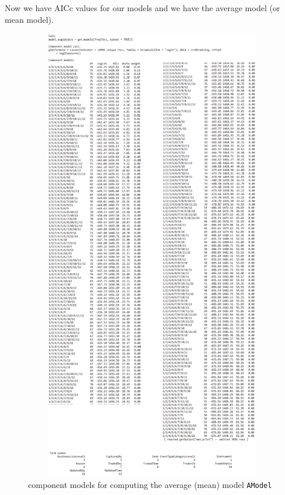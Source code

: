 \documentclass{DissertateUSU}
\begin{document}
\normalsize

Now we have AICc values for our models and we have the average model (or
mean model).

\begin{figure}
\centering
\includegraphics[height=20cm, width=15cm]{Get_models_bin1.eps}
\caption[Model averaging]{component models for computing the average (mean) model \texttt{AModel}}
\label{AModel_Summary1}
\end{figure}
\end{document}
